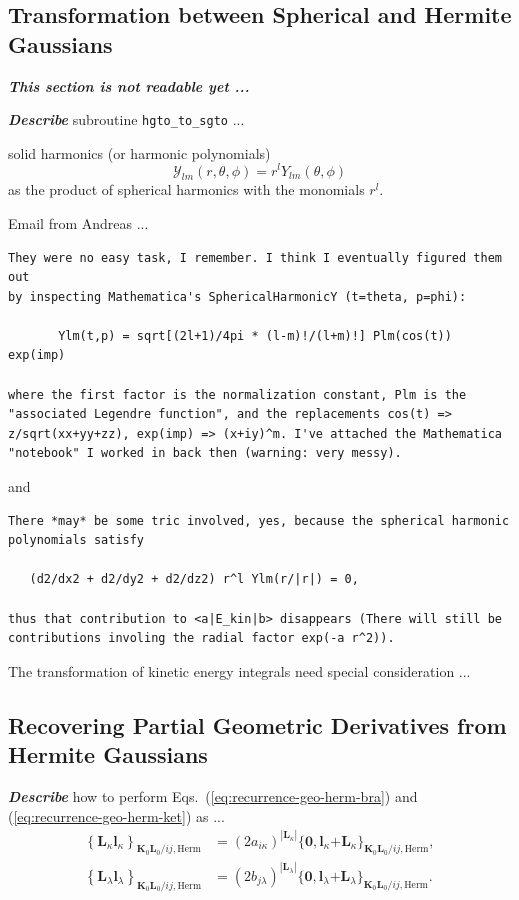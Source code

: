 \documentclass[a4paper,11pt,twoside,openright]{book}
\newcommand{\fixme}[1]{\textbf{\textit{\color{red} #1}}}
\begin{document}
\subsection{Transformation between Spherical and Hermite Gaussians}
\label{subsec:hgto-to-sgto}

\fixme{This section is not readable yet ...}

\fixme{Describe} subroutine \verb|hgto_to_sgto| ...

solid harmonics (or harmonic polynomials)
\begin{equation}
  \mathcal{Y}_{lm}(r,\theta,\phi)=r^{l}Y_{lm}(\theta,\phi)
\end{equation}
as the product of spherical harmonics with the monomials $r^{l}$.

Email from Andreas ...
\begin{verbatim}
They were no easy task, I remember. I think I eventually figured them out
by inspecting Mathematica's SphericalHarmonicY (t=theta, p=phi):

       Ylm(t,p) = sqrt[(2l+1)/4pi * (l-m)!/(l+m)!] Plm(cos(t)) exp(imp)

where the first factor is the normalization constant, Plm is the 
"associated Legendre function", and the replacements cos(t) => 
z/sqrt(xx+yy+zz), exp(imp) => (x+iy)^m. I've attached the Mathematica 
"notebook" I worked in back then (warning: very messy).
\end{verbatim}
and
\begin{verbatim}
There *may* be some tric involved, yes, because the spherical harmonic
polynomials satisfy
 
   (d2/dx2 + d2/dy2 + d2/dz2) r^l Ylm(r/|r|) = 0,
 
thus that contribution to <a|E_kin|b> disappears (There will still be
contributions involing the radial factor exp(-a r^2)).
\end{verbatim}

The transformation of kinetic energy integrals need special consideration ...

\subsection{Recovering Partial Geometric Derivatives from Hermite Gaussians}
\label{subsec:hgto-to-geo}

\fixme{Describe} how to perform Eqs.~(\ref{eq:recurrence-geo-herm-bra}) and (\ref{eq:recurrence-geo-herm-ket}) as ...
\begin{align}
  \left\{\boldsymbol{L}_{\kappa}\boldsymbol{l}_{\kappa}\right\}_{\boldsymbol{K}_{0}\boldsymbol{L}_{0}/ij,\text{Herm}}
  &=(2a_{i\kappa})^{|\boldsymbol{L}_{\kappa}|}%
    \{\boldsymbol{0},\boldsymbol{l}_{\kappa}\mathrm{+}\boldsymbol{L}_{\kappa}\}_{\boldsymbol{K}_{0}\boldsymbol{L}_{0}/ij,\text{Herm}},\\
%
  \left\{\boldsymbol{L}_{\lambda}\boldsymbol{l}_{\lambda}\right\}_{\boldsymbol{K}_{0}\boldsymbol{L}_{0}/ij,\text{Herm}}
  &=(2b_{j\lambda})^{|\boldsymbol{L}_{\lambda}|}%
    \{\boldsymbol{0},\boldsymbol{l}_{\lambda}\mathrm{+}\boldsymbol{L}_{\lambda}\}_{\boldsymbol{K}_{0}\boldsymbol{L}_{0}/ij,\text{Herm}}.
\end{align}
\end{document}

